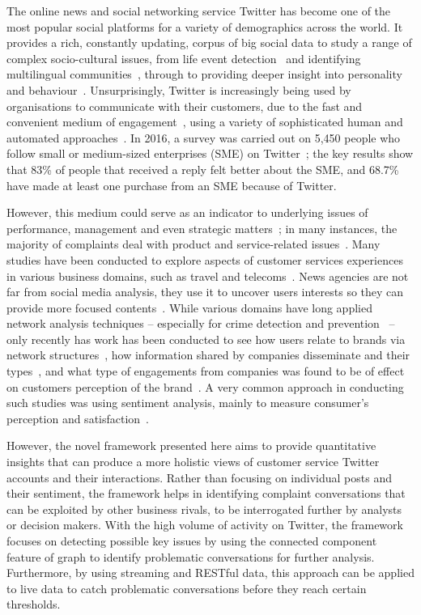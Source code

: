 \documentclass[sigconf]{acmart}
\begin{document}
The online news and social networking service Twitter has become one
of the most popular social platforms for a variety of demographics
across the world. It provides a rich, constantly updating, corpus of
big social data to study a range of complex socio-cultural issues,
from life event detection~\cite{blamey-et-al-2013} and identifying
multilingual communities~\cite{albishry-et-al:iccci2017}, through to
providing deeper insight into personality and
behaviour~\cite{mostafa-et-al-ai2016}. Unsurprisingly, Twitter is
increasingly being used by organisations to communicate with their
customers, due to the fast and convenient medium of
engagement~\cite{ma-et-al:2015}, using a variety of sophisticated
human and automated
approaches~\cite{verhagen-et-al:2014,xu-et-al:2017}. In 2016, a survey
was carried out on 5,450 people who follow small or medium-sized
enterprises (SME) on Twitter~\cite{Twitter2016}; the key results show
that 83\% of people that received a reply felt better about the SME,
and 68.7\% have made at least one purchase from an SME because of
Twitter.

However, this medium could serve as an indicator to underlying issues
of performance, management and even strategic
matters~\cite{gregoire-et-al:2015}; in many instances, the majority of
complaints deal with product and service-related
issues~\cite{einwiller+steilen:2015}. Many studies have been conducted
to explore aspects of customer services experiences in various
business domains, such as travel and
telecoms~\cite{Shakeel2017,Zhang2016,Wattimena2017,misopoulos-et-al:2014,Khatoon2017}.
News agencies are not far from social media analysis, they use it to
uncover users interests so they can provide more focused
contents~\cite{Nigam2016}. While various domains have long applied
network analysis techniques -- especially for crime detection and
prevention~\cite{oatley+crick:2015,oatley-et-al:dasc2015} -- only
recently has work has been conducted to see how users relate to brands
via network structures~\cite{Cutler2017}, how information shared by
companies disseminate and their types~\cite{Piccialli2017}, and what
type of engagements from companies was found to be of effect on
customers perception of the brand~\cite{Ibrahim2017}. A very common
approach in conducting such studies was using sentiment analysis,
mainly to measure consumer's perception and
satisfaction~\cite{Zhang2016,Al-Hussaini2017}.

However, the novel framework presented here aims to provide
quantitative insights that can produce a more holistic views of
customer service Twitter accounts and their interactions. Rather than
focusing on individual posts and their sentiment, the framework helps
in identifying complaint conversations that can be exploited by other
business rivals, to be interrogated further by analysts or decision
makers. With the high volume of activity on Twitter, the framework
focuses on detecting possible key issues by using the connected
component feature of graph to identify problematic conversations for
further analysis. Furthermore, by using streaming and RESTful data,
this approach can be applied to live data to catch problematic
conversations before they reach certain thresholds.
\end{document}
